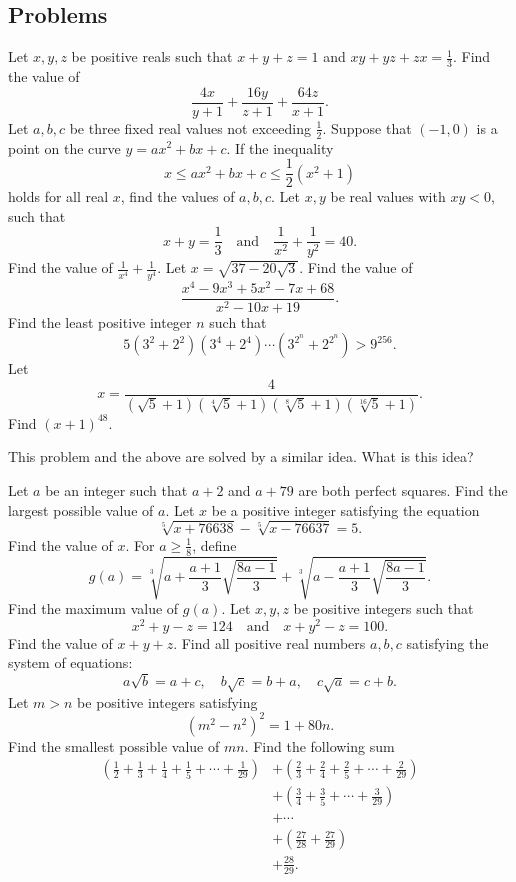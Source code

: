 \documentclass[../jarvis.tex]{subfiles}
\begin{document}
\subsection{Problems}
\problem[2016 SMO(J) P34]Let $x,y,z$ be positive reals such that $x+y+z=1$ and $xy+yz+zx=\frac{1}{3}$. Find the value of
$$\frac{4x}{y+1}+\frac{16y}{z+1}+\frac{64z}{x+1}.$$
\problem[2019 SMO(O)]Let $a,b,c$ be three fixed real values not exceeding $\frac{1}{2}$. Suppose that $(-1,0)$ is a point on the curve $y=ax^2+bx+c$. If the inequality 
$$x\leq ax^2+bx+c\leq\frac{1}{2}(x^2+1)$$ holds for all real $x$, find the values of $a,b,c$.
\problem[2014 SMO(J) P29]Let $x,y$ be real values with $xy<0$, such that
$$x+y=\frac{1}{3}\quad\text{and}\quad\frac{1}{x^2}+\frac{1}{y^2}=40.$$
Find the value of $\frac{1}{x^4}+\frac{1}{y^4}$.
\problem[2014 SMO(S) P20]Let $x=\sqrt{37-20\sqrt{3}}$. Find the value of 
$$\frac{x^4-9x^3+5x^2-7x+68}{x^2-10x+19}.$$
\problem[2017 SMO(S) P29]Find the least positive integer $n$ such that
$$5(3^2+2^2)(3^4+2^4)\cdots(3^{2^n}+2^{2^n})>9^{256}.$$
\problem[2005 AIME II/7]Let 
$$x=\frac{4}{(\sqrt{5}+1)(\sqrt[4]{5}+1)(\sqrt[8]{5}+1)(\sqrt[16]{5}+1)}.$$
Find $(x+1)^{48}.$
\begin{remark}
    This problem and the above are solved by a similar idea. What is this idea?
\end{remark}
\problem[2017 SMO(J) P24]Let $a$ be an integer such that $a+2$ and $a+79$ are both perfect squares. Find the largest possible value of $a$.
\problem[2020 SMO(J) P25]Let $x$ be a positive integer satisfying the equation
$$\sqrt[5]{x+76638}-\sqrt[5]{x-76637}=5.$$
Find the value of $x$.
\problem[2014 SMO(J) P32]For $a\geq\frac{1}{8}$, define
$$g(a)=\sqrt[3]{a+\frac{a+1}{3}\sqrt{\frac{8a-1}{3}}}+\sqrt[3]{a-\frac{a+1}{3}\sqrt{\frac{8a-1}{3}}}.$$
Find the maximum value of $g(a)$.
\problem[2016 SMO(J) P28]Let $x,y,z$ be positive integers such that
$$x^2+y-z=124\quad\text{and}\quad x+y^2-z=100.$$
Find the value of $x+y+z$.
\problem[2014 SMO(S) R2/2]Find all positive real numbers $a,b,c$ satisfying the system of equations:
$$a\sqrt{b}=a+c,\quad b\sqrt{c}=b+a,\quad c\sqrt{a}=c+b.$$
\problem[2020 SMO(J) P24]Let $m>n$ be positive integers satisfying
$$(m^2-n^2)^2=1+80n.$$
Find the smallest possible value of $mn$.
\problem[2014 SMO(J) P30]Find the following sum
\begin{align*}
    \left(\frac{1}{2}+\frac{1}{3}+\frac{1}{4}+\frac{1}{5}+\cdots+\frac{1}{29}\right)&+\left(\frac{2}{3}+\frac{2}{4}+\frac{2}{5}+\cdots+\frac{2}{29}\right) \\
    &+\left(\frac{3}{4}+\frac{3}{5}+\cdots+\frac{3}{29}\right) \\
    &+\cdots \\
    &+\left(\frac{27}{28}+\frac{27}{29}\right) \\
    &+\frac{28}{29}.
\end{align*}
\end{document}
